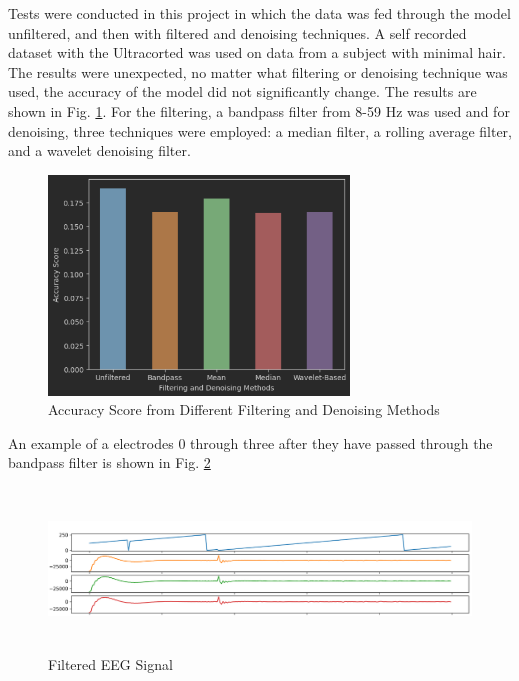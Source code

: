 \documentclass[conference]{IEEEtran}
\begin{document}
        Tests were conducted in this project in which the data was fed through the model unfiltered, and then with filtered and denoising techniques. A self recorded dataset with the Ultracorted was used on data from a subject with minimal hair. The results were unexpected, no matter what filtering or denoising technique was used, the accuracy of the model did not significantly change. The results are shown in Fig. \ref{fig:filtering_denoising}. For the filtering, a bandpass filter from 8-59 Hz was used and for denoising, three techniques were employed:  a median filter, a rolling average filter, and a wavelet denoising filter.   
        \begin{figure}[htbp]
            \centering
            \includegraphics[keepaspectratio, height=2.3in]{figs/paper/filtering_methods.png}
            \caption{Accuracy Score from Different Filtering and Denoising Methods}
            \label{fig:filtering_denoising}
        \end{figure}

        An example of a electrodes 0 through three after they have passed through the bandpass filter is shown in Fig. \ref{fig:filtered_eeg} 

        \begin{figure}[htbp]
            \centering
            \includegraphics[keepaspectratio, height=1.7in, angle=90]{figs/paper/filtered_signal.png}
            \caption{Filtered EEG Signal}
            \label{fig:filtered_eeg}
        \end{figure}
\end{document}
